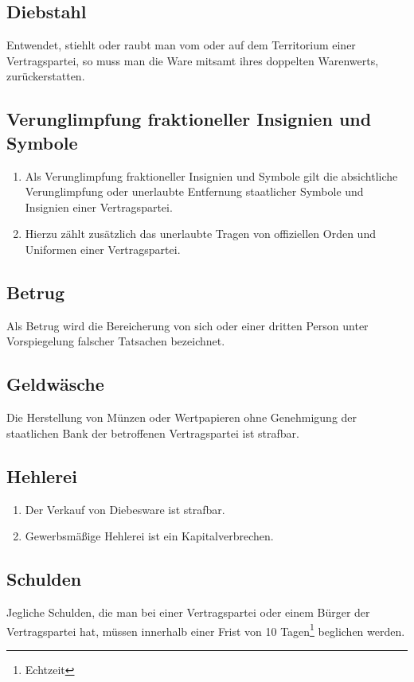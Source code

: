 \documentclass{article}
\begin{document}
\subsection{Diebstahl}
Entwendet, stiehlt oder raubt man vom oder auf dem Territorium einer Vertragspartei, so muss man die Ware mitsamt ihres doppelten Warenwerts, zurückerstatten.

\subsection{Verunglimpfung fraktioneller Insignien und Symbole}
\begin{enumerate}[(1)]
    \item Als Verunglimpfung fraktioneller Insignien und Symbole gilt die absichtliche Verunglimpfung oder unerlaubte Entfernung staatlicher Symbole und Insignien einer Vertragspartei.
    \item Hierzu zählt zusätzlich das unerlaubte Tragen von offiziellen Orden und Uniformen einer Vertragspartei.
\end{enumerate}

\subsection{Betrug}
Als Betrug wird die Bereicherung von sich oder einer dritten Person unter Vorspiegelung falscher Tatsachen bezeichnet.

\subsection{Geldwäsche}
Die Herstellung von Münzen oder Wertpapieren ohne Genehmigung der staatlichen Bank der betroffenen Vertragspartei ist strafbar.

\subsection{Hehlerei}
\begin{enumerate}[(1)]
    \item Der Verkauf von Diebesware ist strafbar.
    \item Gewerbsmäßige Hehlerei ist ein Kapitalverbrechen.
\end{enumerate}

\subsection{Schulden}
Jegliche Schulden, die man bei einer Vertragspartei oder einem Bürger der Vertragspartei hat, müssen innerhalb einer Frist von 10 Tagen\footnote{Echtzeit} beglichen werden.
\end{document}
